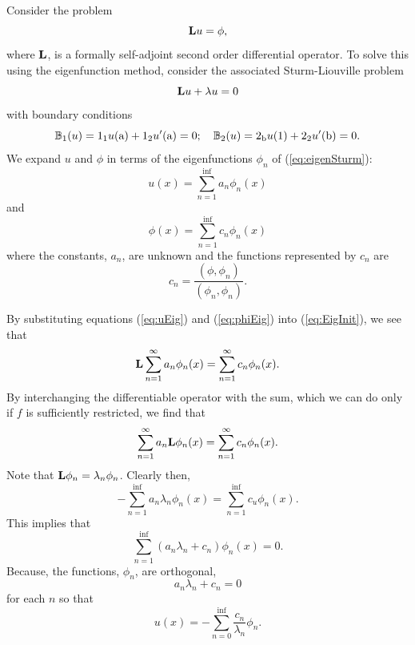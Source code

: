 \begin{example}
    Consider the problem
    \begin{equation}\label{eq:EigInit}
        \mathrm{\bf{L}} u = \phi,
    \end{equation}
    where \(\mathrm{\bf{L}}\), is a formally self-adjoint second order differential operator.
    To solve this using the eigenfunction method, consider the associated Sturm-Liouville problem
    \begin{equation}\label{eq:eigenSturm}
        \mathrm{\bf{L}} u + \lambda u = 0
    \end{equation}
    with boundary conditions
    \begin{equation*}
        \mathbb{B}_1(u) =1_{1}u(\mathrm{a})+1_{2}u'(\mathrm{a}) = 0;\quad \mathbb{B}_2(u) = 2_{\mathrm{b}}u(1)+2_{2}u'(\mathrm{b}) = 0.
    \end{equation*}
    We expand \(u\) and \(\phi\) in terms of the eigenfunctions \(\phi_n\) of (\ref*{eq:eigenSturm}):
    \begin{equation}\label{eq:uEig}
        u(x) = \sum_{n=1}^{\inf} a_n\phi_n(x)
    \end{equation}
    and 
    \begin{equation}\label{eq:phiEig}
        \phi(x) = \sum_{n=1}^{\inf} c_n\phi_n(x)
    \end{equation}
    where the constants, \(a_n\), are unknown and the functions represented by \(c_n\) are 
    \begin{equation}
        c_n = \frac{(\phi, \phi_n)}{(\phi_n, \phi_n)}.
    \end{equation}
\end{example}

By substituting equations (\ref{eq:uEig}) and (\ref{eq:phiEig}) into (\ref{eq:EigInit}), we see that 
\begin{equation*}
    \mathrm{\bf{L}} \sum_{n=1}^{\infty} a_n\phi_n(x) = \sum_{n=1}^{\infty} c_n\phi_n(x).
\end{equation*}
By interchanging the differentiable operator with the sum, which we can do only if \(f\) is sufficiently restricted, we find that 
\begin{equation*}
    \sum_{n=1}^{\infty} a_n\mathrm{\bf{L}} \phi_n(x) = \sum_{n=1}^{\infty} c_n\phi_n(x).
\end{equation*}
Note that \(\mathrm{\bf{L}}\phi_n = \lambda_n\phi_n\). Clearly then,
\begin{equation*}
    -\sum_{n=1}^{\inf} a_n \lambda_n \phi_n(x) = \sum_{n=1}^\inf c_u\phi_n(x).
\end{equation*}
This implies that
\begin{equation*}
    \sum_{n=1}^{\inf} (a_n\lambda_n + c_n) \phi_n(x) = 0.
\end{equation*}
Because, the functions, \(\phi_n\), are orthogonal, 
\begin{equation*}
    a_n\lambda_n + c_n = 0
\end{equation*}
for each \(n\) so that
\begin{equation}\label{eq:eigSln}
    u(x)=-\sum_{n=0}^{\inf} \frac{c_n}{\lambda_n} \phi_n.
\end{equation}


